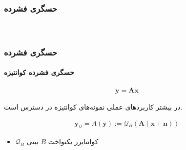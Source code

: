\begin{frame}
\frametitle{حسگری فشرده}

\begin{columns} 
\begin{figure}
	\centering
	
\end{figure}
\end{columns}
\end{frame}
\begin{frame}
\frametitle{حسگری فشرده}
\framesubtitle{حسگری فشرده کوانتیزه}
\begin{align}
\label{eq2}
\bm{y}=\bm{A}\bm{x}
\end{align}
\pause
\begin{block}{}
\centering
در بیشتر کاربرد‌های عملی نمونه‌های کوانتیزه در دسترس است.
\end{block}

\begin{align}
\label{eq3}
\bm{y}_{\mathcal{Q}} =A(\bm{y}):= \mathcal{Q}_{B}\left(\bm{A}(\bm{x}+\bm{n})\right)
\end{align}
\begin{itemize}
\item{$\mathcal{Q}_{B}$
کوانتایزر یکنواخت
$B$
بیتی}
\end{itemize}
\end{frame}
